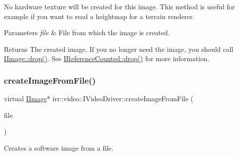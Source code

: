 No hardware texture will be created for this image. This method is useful for example if you want to read a heightmap for a terrain renderer. 
\begin{DoxyParams}{Parameters}
{\em file} & File from which the image is created. \\
\hline
\end{DoxyParams}
\begin{DoxyReturn}{Returns}
The created image. If you no longer need the image, you should call \hyperlink{classirr_1_1IReferenceCounted_a03856a09355b89d178090c4a5f738543}{I\+Image\+::drop()}. See \hyperlink{classirr_1_1IReferenceCounted_a03856a09355b89d178090c4a5f738543}{I\+Reference\+Counted\+::drop()} for more information. 
\end{DoxyReturn}
\mbox{\label{classirr_1_1video_1_1IVideoDriver_a322c41fa08c1da9de4633cf8a1e68607}} 
\subsubsection{\texorpdfstring{create\+Image\+From\+File()}{createImageFromFile()}\hspace{0.1cm}{\footnotesize\ttfamily [4/4]}}
{\footnotesize\ttfamily virtual \hyperlink{classirr_1_1video_1_1IImage}{I\+Image}$\ast$ irr\+::video\+::\+I\+Video\+Driver\+::create\+Image\+From\+File (\begin{DoxyParamCaption}\item[{\hyperlink{classirr_1_1io_1_1IReadFile}{io\+::\+I\+Read\+File} $\ast$}]{file }\end{DoxyParamCaption})\hspace{0.3cm}{\ttfamily [pure virtual]}}



Creates a software image from a file. 


